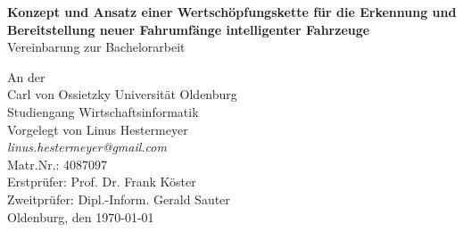 \documentclass{article}
\begin{document}
\begin{titlepage}
	\begin{figure}[H]
		\centering
	\end{figure}
	
	\begin{center}
		\large{\textbf{Konzept und Ansatz einer Wertschöpfungskette für die Erkennung und Bereitstellung neuer Fahrumfänge intelligenter Fahrzeuge}}\\
		\large Vereinbarung zur Bachelorarbeit
	\end{center}
	\vfill
	\begin{center}
		\large{
			An der\\
			Carl von Ossietzky Universität Oldenburg\\
			Studiengang Wirtschaftsinformatik\\
			
			\vspace{1cm}
			Vorgelegt von Linus Hestermeyer\\ 
			\textit{linus.hestermeyer@gmail.com}\\
			Matr.Nr.: 4087097\\
			\vfill
			Erstprüfer: Prof. Dr. Frank Köster\\
			Zweitprüfer: Dipl.-Inform. Gerald Sauter\\
			\vfill
			\noindent
			Oldenburg, den \today
		}
	\end{center}
\end{titlepage}
\thispagestyle{empty}
\tableofcontents
\thispagestyle{empty}
\clearpage

\clearpage


\clearpage


\end{document}
